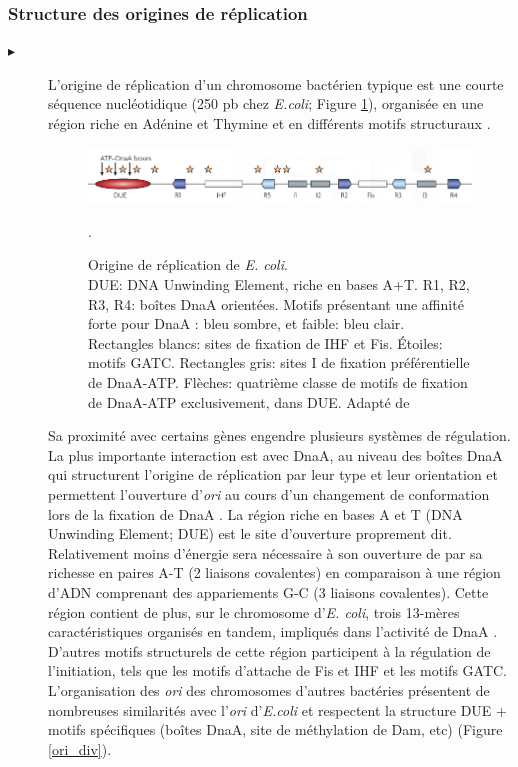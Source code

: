 \subsubsection{Structure des origines de réplication}\label{oristruct}
\begin{description}
\item[$\blacktriangleright$] L'origine de réplication d'un chromosome bactérien typique est une courte séquence nucléotidique (250 pb chez \textit{E.coli}; Figure \ref{figoriecoli}), organisée en une région riche en Adénine et Thymine et en différents motifs structuraux \citep{Robinson2005,rajewska2012rich}.
\begin{figure}[H]
	\begin{center}
		\includegraphics[width=0.9\linewidth]{./img/ori_schema.png}
	\caption[Structure de l'origine de réplication de \textit{E. coli}]{Origine de réplication de \textit{E. coli}.\\ DUE: DNA Unwinding Element, riche en bases A+T. R1, R2, R3, R4: boîtes DnaA orientées. Motifs présentant une affinité forte pour DnaA : bleu sombre, et faible: bleu clair. Rectangles blancs: sites de fixation de IHF et Fis. Étoiles: motifs GATC. Rectangles gris: sites I de fixation préférentielle de DnaA-ATP. Flèches: quatrième classe de motifs de fixation de DnaA-ATP exclusivement, dans DUE. Adapté de \citep{Mott2007}}\label{figoriecoli}.
	\end{center}
\end{figure} 
Sa proximité avec certains gènes engendre plusieurs systèmes de régulation. La plus importante interaction est avec DnaA, au niveau des boîtes DnaA qui structurent l'origine de réplication par leur type et leur orientation et permettent l'ouverture d'\textit{ori} au cours d'un changement de conformation lors de la fixation de DnaA \citep{Mott2007}. La région riche en bases A et T (DNA Unwinding Element; DUE) est le site d'ouverture proprement dit. Relativement moins d'énergie sera nécessaire à son ouverture de par sa richesse en paires A-T (2 liaisons covalentes) en comparaison à une région d'ADN comprenant des appariements G-C (3 liaisons covalentes). Cette région contient de plus, sur le chromosome d'\textit{E. coli}, trois 13-mères caractéristiques organisés en tandem, impliqués dans l'activité de DnaA \citep{Mott2007}. D'autres motifs structurels de cette région participent à la régulation de l'initiation, tels que les motifs d'attache de Fis et IHF et les motifs GATC. L'organisation des \textit{ori} des chromosomes d'autres bactéries présentent de nombreuses similarités avec l'\textit{ori} d'\textit{E.coli} et respectent la structure DUE + motifs spécifiques (boîtes DnaA, site de méthylation de Dam, etc) (Figure \ref{ori_div}). 
\end{description}

